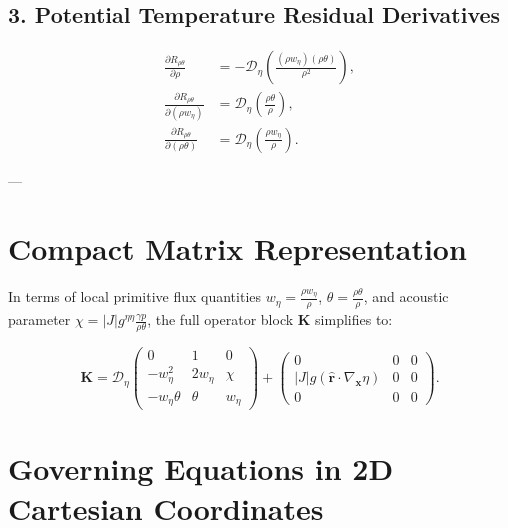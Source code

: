 \documentclass[11pt,a4paper]{article}
\begin{document}
\subsection{3. Potential Temperature Residual Derivatives}
\begin{align}
\frac{\partial R_{\rho \theta}}{\partial \rho} &= -\mathcal{D}_\eta \left( \frac{(\rho w_\eta)(\rho \theta)}{\rho^2} \right), \\[6pt]
\frac{\partial R_{\rho \theta}}{\partial (\rho w_\eta)} &= \mathcal{D}_\eta \left( \frac{\rho \theta}{\rho} \right), \\[6pt]
\frac{\partial R_{\rho \theta}}{\partial (\rho \theta)} &= \mathcal{D}_\eta \left( \frac{\rho w_\eta}{\rho} \right).
\end{align}

---

\section{Compact Matrix Representation}

In terms of local primitive flux quantities $w_\eta = \frac{\rho w_\eta}{\rho}$, $\theta = \frac{\rho \theta}{\rho}$, and acoustic parameter $\chi = |J| g^{\eta\eta} \frac{\gamma p}{\rho \theta}$, the full operator block $\mathbf{K}$ simplifies to:

\begin{equation}
\mathbf{K} = \mathcal{D}_\eta \begin{pmatrix}
0 & 1 & 0 \\[4pt]
-w_\eta^2 & 2 w_\eta & \chi \\[4pt]
-w_\eta \theta & \theta & w_\eta
\end{pmatrix}
+ \begin{pmatrix}
0 & 0 & 0 \\[4pt]
|J| g (\hat{\boldsymbol{r}} \cdot \nabla_{\boldsymbol{x}} \eta) & 0 & 0 \\[4pt]
0 & 0 & 0
\end{pmatrix}.
\end{equation}



	\section{Governing Equations in 2D Cartesian Coordinates}
	
\end{document}
